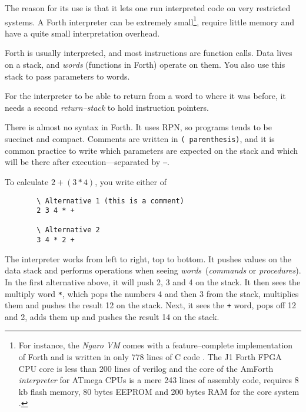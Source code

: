 
The reason for its use is that it lets one run interpreted code on very
restricted systems. A Forth interpreter can be extremely small\footnote{For
instance, the \textit{Ngaro \ac{VM}} comes with a feature--complete
implementation of Forth and is written in only 778 lines of C code
\cite{ngaro.vm.core}.  The J1 Forth FPGA CPU core is less than 200 lines of verilog
\cite{bowman2010j1} and the core of the AmForth \textit{interpreter} for
ATmega CPUs is a mere 243 lines of assembly code, requires 8 kb flash
memory, 80 bytes EEPROM and 200 bytes RAM for the core system
\cite{amforth}.}, require little memory and have a quite small
interpretation overhead.

Forth is usually interpreted, and most instructions are function calls.
Data lives on a stack, and \textit{words} (functions in Forth) operate on them.
You also use this stack to pass parameters to words.

For the interpreter to be able to return from a word to where it was before,
it needs a second \textit{return--stack} to hold instruction pointers.

There is almost no syntax in Forth.  It uses \ac{RPN}, so programs tends to
be succinct and compact.  Comments are written in \texttt{( parenthesis)},
and it is common practice to write which parameters are expected on the
stack and which will be there after execution---separated by \texttt{--}.

To calculate $2 + (3 * 4)$, you write either of

\begin{figure}[H]
  \centering
  \begin{Verbatim}
  \ Alternative 1 (this is a comment)
  2 3 4 * +

  \ Alternative 2
  3 4 * 2 +
  \end{Verbatim}
\end{figure}

The interpreter works from left to right, top to bottom. It pushes values on
the data stack and performs operations when seeing
\textit{words} (\textit{commands} or \textit{procedures}).  In the first
alternative above, it will push 2, 3 and 4 on the stack.
  It then sees the multiply word \texttt{*}, which pops the
numbers 4 and then 3 from the stack, multiplies them and pushes the result
12 on the stack.  Next, it sees the \texttt{+} word,
pops off 12 and 2, adds them up and pushes the result 14 on the stack.

